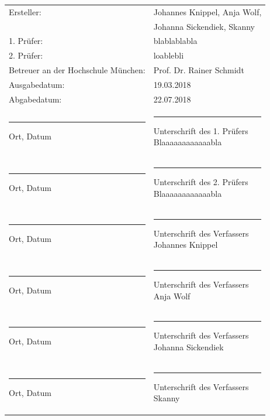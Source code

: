 	
\newpage
\thispagestyle{empty}
\begin{flushleft}	
	\begin{tabular}[H]{ll}
		
		Ersteller: & \large{Johannes Knippel, Anja Wolf,}\\[0.2cm]
		 			& \large{Johanna Sickendiek, Skanny}\\[0,2cm]
		1. Prüfer:		  & \large{blablablabla}\\[0.2cm]
		2. Prüfer:		  & \large{loablebli}\\[.7cm]
		
		
		Betreuer an der Hochschule München: 	& \large{Prof. Dr. Rainer Schmidt}\\[0.5cm]
		Ausgabedatum:					& \large{19.03.2018}\\[0.5cm]
		Abgabedatum:					& \large{22.07.2018}\\[3.5cm]
	
		
	
		\parbox{7cm}{\hrule\medskip Ort, Datum\\ [0.3cm]}	&	\parbox{7cm}{\hrule\medskip Unterschrift des 1. Prüfers\\ [0.2cm]Blaaaaaaaaaaaabla}\\[1.5cm]
		\parbox{7cm}{\hrule\medskip Ort, Datum\\ [0.31cm]}	&	\parbox{7cm}{\hrule\medskip Unterschrift des 2. Prüfers\\ [0.2cm]Blaaaaaaaaaaaabla}\\[1.5cm]
		\parbox{7cm}{\hrule\medskip Ort, Datum\\ [0.33cm]}	&	\parbox{7cm}{\hrule\medskip Unterschrift des Verfassers\\ [0.2cm]Johannes Knippel}\\[1.5cm]
		\parbox{7cm}{\hrule\medskip Ort, Datum\\ [0.33cm]}	&	\parbox{7cm}{\hrule\medskip Unterschrift des Verfassers\\ [0.2cm]Anja Wolf}\\[1.5cm]
		\parbox{7cm}{\hrule\medskip Ort, Datum\\ [0.33cm]}	&	\parbox{7cm}{\hrule\medskip Unterschrift des Verfassers\\ [0.2cm]Johanna Sickendiek}\\[1.5cm]
		\parbox{7cm}{\hrule\medskip Ort, Datum\\ [0.33cm]}	&	\parbox{7cm}{\hrule\medskip Unterschrift des Verfassers\\ [0.2cm]Skanny}\\
	\end{tabular}
\end{flushleft}

	
	
	
